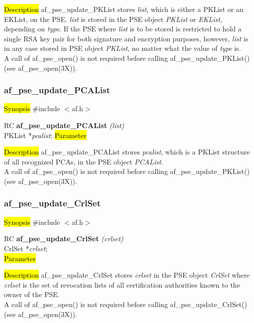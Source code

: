 
\hl{Description}
af\_pse\_update\_PKList stores {\em list}, which is either a PKList or an EKList, 
on the PSE. {\em list} is stored in the PSE object {\em PKList} or {\em EKList}, depending
on {\em type}.
If the PSE where {\em list} is to be stored is restricted to hold a single RSA key pair
for both signature and encryption purposes, however, {\em list} is in any case stored in PSE object {\em PKList}, no
matter what the value of {\em type} is.
\\ [1em]
A call of af\_pse\_open() is not required before calling af\_pse\_update\_PKList()
(see af\_pse\_open(3X)).

\subsubsection{af\_pse\_update\_PCAList}
\label{af_pse_update_PCAList}
\hl{Synopsis}
\#include $<$af.h$>$

RC {\bf af\_pse\_update\_PCAList} {\em (list)} \\
PKList *{\em pcalist};
\hl{Parameter}

\hl{Description}
af\_pse\_update\_PCAList stores {\em pcalist}, which is a PKList structure of all recognized
PCAs, in the PSE object {\em PCAList}.
\\ [1em]
A call of af\_pse\_open() is not required before calling af\_pse\_update\_PKList()
(see af\_pse\_open(3X)).

\subsubsection{af\_pse\_update\_CrlSet}
\label{af_update_CrlSet}
\hl{Synopsis}
\#include $<$af.h$>$

RC {\bf af\_pse\_update\_CrlSet} {\em (crlset)} \\
CrlSet *{\em crlset}; \\
\hl{Parameter}

\hl{Description}
af\_pse\_update\_CrlSet stores {\em crlset} in the PSE object {\em CrlSet} 
where {\em crlset} is the set of revocation lists of all certification authorities 
known to the owner of the PSE.
\\ [1em]
A call of af\_pse\_open() is not required before calling af\_pse\_update\_CrlSet()
(see af\_pse\_open(3X)).


